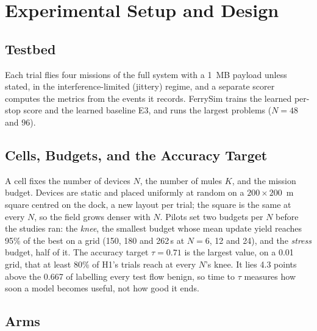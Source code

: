 \section{Experimental Setup and Design}
\label{sec:setup}

\subsection{Testbed}
\label{sec:setup:testbed}

Each trial flies four missions of the full system with a 1~MB payload unless
stated, in the
interference-limited (jittery) regime, and a separate scorer computes the
metrics from the events it records. FerrySim trains the learned per-stop score
and the learned baseline E3, and runs the largest problems ($N=48$ and $96$).

\subsection{Cells, Budgets, and the Accuracy Target}
\label{sec:setup:cells}

A cell fixes the number of devices $N$, the number of mules $K$, and the mission
budget. Devices are static and placed uniformly at random on a $200\times200$~m
square centred on the dock, a new layout per trial; the square is the same at
every $N$, so the field grows denser with $N$. Pilots set two budgets per $N$
before the studies ran: the \emph{knee}, the smallest budget whose mean update
yield reaches 95\% of the best on a grid (150, 180 and 262\,s at $N=6$, 12 and
24), and the \emph{stress} budget, half of it. The accuracy target $\tau=0.71$
is the largest value, on a 0.01 grid, that at least 80\% of H1's trials reach at
every $N$'s knee. It lies 4.3 points above the 0.667 of labelling every test flow
benign, so time to $\tau$ measures how soon a model becomes useful, not how good
it ends.

\subsection{Arms}
\label{sec:setup:arms}

